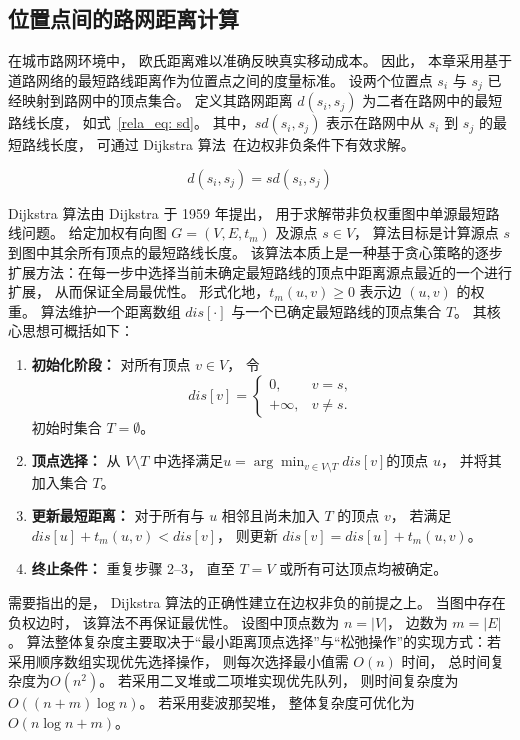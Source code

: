 \subsection{位置点间的路网距离计算}

在城市路网环境中， 欧氏距离难以准确反映真实移动成本。 因此， 本章采用基于道路网络的最短路线距离作为位置点之间的度量标准。 设两个位置点 $s_i$ 与 $s_j$ 已经映射到路网中的顶点集合。 定义其路网距离 $d(s_i,s_j)$ 为二者在路网中的最短路线长度， 如式~\eqref{rela_eq: sd}。 其中，$sd(s_i, s_j)$ 表示在路网中从 $s_i$ 到 $s_j$ 的最短路线长度， 可通过 Dijkstra 算法~在边权非负条件下有效求解。

\begin{equation}\label{rela_eq: sd}
    d(s_i, s_j) = sd(s_i, s_j)
\end{equation}

Dijkstra 算法由 Dijkstra 于 1959 年提出， 用于求解带非负权重图中单源最短路线问题。 给定加权有向图 $G=(V,E, t_m)$ 及源点 $s \in V$， 算法目标是计算源点 $s$ 到图中其余所有顶点的最短路线长度。 该算法本质上是一种基于贪心策略的逐步扩展方法：在每一步中选择当前未确定最短路线的顶点中距离源点最近的一个进行扩展， 从而保证全局最优性。 形式化地，$t_m(u,v) \ge 0$ 表示边 $(u,v)$ 的权重。 算法维护一个距离数组 $dis[\cdot]$ 与一个已确定最短路线的顶点集合 $T$。 其核心思想可概括如下：

\begin{enumerate}
    \item \textbf{初始化阶段：}
    对所有顶点 $v \in V$， 令
    \begin{equation}
        dis[v] =
        \begin{cases}
            0, & v = s, \\
            +\infty, & v \neq s.
        \end{cases}
    \end{equation}
    初始时集合 $T = \emptyset$。
    \item \textbf{顶点选择：}
    从 $V \setminus T$ 中选择满足$u = \arg\min_{v \in V \setminus T} dis[v]$的顶点 $u$， 并将其加入集合 $T$。
    \item \textbf{更新最短距离：}
    对于所有与 $u$ 相邻且尚未加入 $T$ 的顶点 $v$， 若满足$dis[u] + t_m(u,v) < dis[v]$， 则更新 $dis[v] = dis[u] + t_m(u,v)$。
    \item \textbf{终止条件：}
    重复步骤 2--3， 直至 $T = V$ 或所有可达顶点均被确定。
\end{enumerate}

需要指出的是， Dijkstra 算法的正确性建立在边权非负的前提之上。 当图中存在负权边时， 该算法不再保证最优性。 设图中顶点数为 $n = |V|$， 边数为 $m = |E|$。 算法整体复杂度主要取决于“最小距离顶点选择”与“松弛操作”的实现方式：若采用顺序数组实现优先选择操作， 则每次选择最小值需 $O(n)$ 时间， 总时间复杂度为$O(n^2)$。 若采用二叉堆或二项堆实现优先队列， 则时间复杂度为$ O((n+m)\log n)$。 若采用斐波那契堆， 整体复杂度可优化为$O(n \log n + m)$。


